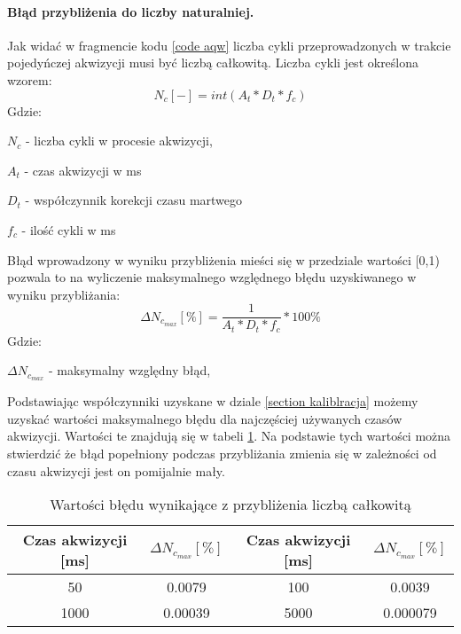 \paragraph{Błąd przybliżenia do liczby naturalniej.}
Jak widać w fragmencie kodu \ref{code aqw} liczba cykli przeprowadzonych w trakcie pojedyńczej akwizycji musi być liczbą całkowitą. Liczba cykli jest określona wzorem:
\begin{equation}
        N_c [-] = int(A_t*D_t*f_c)
\end{equation}
Gdzie:
\begin{description}
        \item $N_c$ - liczba cykli w procesie akwizycji,
        \item $A_t$ - czas  akwizycji w ms
        \item $D_t$ - współczynnik korekcji czasu martwego 
        \item $f_c$ - ilość cykli w ms
\end{description}

Błąd wprowadzony w wyniku przybliżenia mieści się w przedziale wartości [0,1) pozwala to na wyliczenie maksymalnego względnego błędu uzyskiwanego w wyniku przybliżania:
\begin{equation}
        \Delta N_{c_{max}} [\%] = \frac{1}{A_t*D_t*f_c}  * 100\%
\end{equation} 
Gdzie:
\begin{description}
        \item $\Delta N_{c_{max}}$ - maksymalny względny błąd,
\end{description}

Podstawiając współczynniki uzyskane w dziale \ref{section kaliblracja} możemy uzyskać wartości maksymalnego błędu dla najczęściej używanych czasów akwizycji. Wartości te znajdują się w tabeli \ref{tab przyblizenie niep}. Na podstawie tych wartości można stwierdzić że błąd popełniony podczas przybliżania zmienia się w zależności od czasu akwizycji jest on pomijalnie mały.

\begin{table}
        \centering
        \caption{Wartości błędu wynikające z przybliżenia liczbą całkowitą}
        \label{tab przyblizenie niep}
        \begin{tabular}{|c|c||c|c|}
                \hline
                Czas akwizycji [ms] &   $\Delta N_{c_{max}} [\%]$&Czas akwizycji [ms] &   $\Delta N_{c_{max}} [\%]$ \\ \hline
                50 & 0.0079 & 100 & 0.0039 \\ \hline
                1000 & 0.00039 & 5000 & 0.000079 \\ \hline
        \end{tabular}
\end{table}

